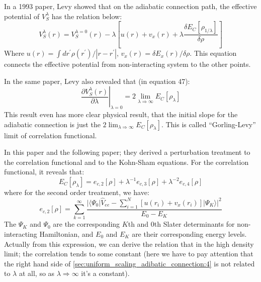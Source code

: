 In a 1993 paper\cite{PhysRevB.47.13105}, Levy showed that on the adiabatic
connection path, the effective potential of $V^{\lambda}_{S}$ has the relation
below:
\begin{equation}
\label{sec:uniform_scaling_adibatic_connection:1}
 V^{\lambda}_{S}(r) = V^{\lambda = 0}_{S}(r) - \lambda\left[ 
u(r) + v_{x}(r) + \lambda\frac{\delta E_{C}[\rho_{1/\lambda}]}{\delta \rho}
\right] 
\end{equation}
Where $u(r) = \int dr^{'}\rho(r^{'})/|r-r^{'}|$, $v_{x}(r) = \delta E_{x}(r)/
\delta \rho$. This equation connects the effective potential from
non-interacting system to the other points.

In the same paper, Levy also revealed that (in equation 47):
\begin{equation}
 \label{sec:uniform_scaling_adibatic_connection:2}
 \left. \frac{\partial V^{\lambda}_{S}(r)}{\partial \lambda}
\right|_{\lambda = 0} = 2\lim_{\lambda\Rightarrow\infty}E_{C}[\rho_{\lambda}] 
\end{equation}
This result even has more clear physical result, that the initial slope for
the adiabatic connection is just the
$2\lim_{\lambda\Rightarrow\infty}E_{C}[\rho_{\lambda}]$. This is called
``Gorling-Levy'' limit of correlation functional.

In this paper and the following paper\cite{PhysRevA.50.196}; they derived a
perturbation treatment to the correlation functional and to the Kohn-Sham
equations. For the correlation functional, it reveals that:
\begin{equation}
\label{sec:uniform_scaling_adibatic_connection:3}
 E_{C}[\rho_{\lambda}] = e_{c,2}[\rho] + \lambda^{-1}e_{c,3}[\rho] + 
\lambda^{-2}e_{c,4}[\rho]
\end{equation}
where for the second order treatment, we have:
\begin{equation}
 \label{sec:uniform_scaling_adibatic_connection:4}
e_{c,2}[\rho] = \sum^{\infty}_{k=1}\frac{
|\langle\Psi_{0}|\hat{V}_{ee} - \sum_{i=1}^{N}[u(r_{i}) +
v_{x}(r_{i})]|\Psi_{K}\rangle|^{2}}{E_{0} - E_{K}}
\end{equation}
The $\Psi_{K}$ and $\Psi_{0}$ are the corresponding $K$th and $0$th Slater
determinants for non-interacting Hamiltonian, and $E_{0}$ and $E_{K}$ are
their corresponding energy levels. Actually from this expression, we can
derive the relation that in the high density limit; the correlation tends to
some constant (here we have to pay attention that the right hand side of
\ref{sec:uniform_scaling_adibatic_connection:4} is not related to $\lambda$ at
all, so as $\lambda\Rightarrow\infty$ it's a constant).
 


